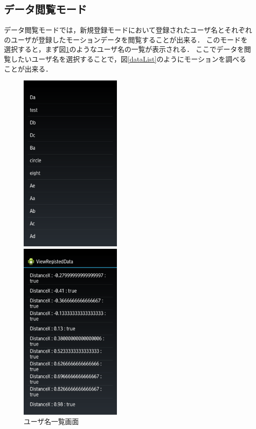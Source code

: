 \documentclass[11pt]{jreport}
\begin{document}
        \subsection{データ閲覧モード}
        データ閲覧モードでは，新規登録モードにおいて登録されたユーザ名とそれぞれのユーザが登録したモーションデータを閲覧することが出来る．
        このモードを選択すると，まず図\ref{userList}のようなユーザ名の一覧が表示される．
        ここでデータを閲覧したいユーザ名を選択することで，図\ref{dataList}のようにモーションを調べることが出来る．

        \begin{figure}[tbp]
            \begin{minipage}{0.5\hsize}
                \begin{center}
                    \includegraphics[width=5cm, bb=0 0 540 960]{UserList.pdf}
                \end{center}
                \caption{ユーザ名一覧画面}
                \label{userList}
            \end{minipage}
            \begin{minipage}{0.5\hsize}
                \begin{center}
                    \includegraphics[width=5cm, bb=0 0 540 960]{DataList.pdf}

\end{center}
\end{minipage}
\end{figure}
\end{document}
